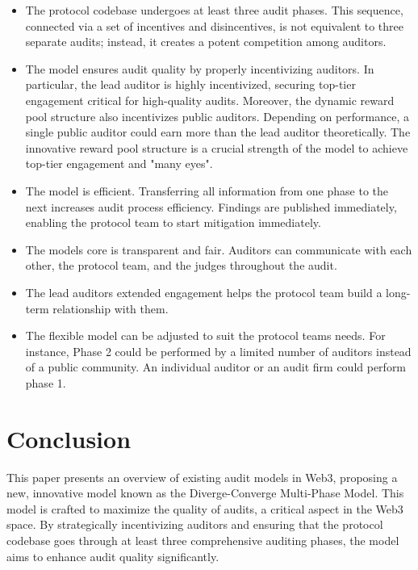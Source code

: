 \documentclass[10pt]{extarticle}
\def\tightlist{}
\begin{document}
\begin{itemize}
\tightlist
\item
  The protocol codebase undergoes at least three audit phases. This
  sequence, connected via a set of incentives and disincentives, is not
  equivalent to three separate audits; instead, it creates a potent
  competition among auditors.
\item
  The model ensures audit quality by properly incentivizing auditors. In
  particular, the lead auditor is highly incentivized, securing top-tier
  engagement critical for high-quality audits. Moreover, the dynamic
  reward pool structure also incentivizes public auditors. Depending on
  performance, a single public auditor could earn more than the lead
  auditor theoretically. The innovative reward pool structure is a
  crucial strength of the model to achieve top-tier engagement and "many
  eyes".
\item
  The model is efficient. Transferring all information from one phase to
  the next increases audit process efficiency. Findings are published
  immediately, enabling the protocol team to start mitigation
  immediately.
\item
  The model\textquotesingle s core is transparent and fair. Auditors can
  communicate with each other, the protocol team, and the judges
  throughout the audit.
\item
  The lead auditor\textquotesingle s extended engagement helps the
  protocol team build a long-term relationship with them.
\item
  The flexible model can be adjusted to suit the protocol
  team\textquotesingle s needs. For instance, Phase 2 could be performed
  by a limited number of auditors instead of a public community. An
  individual auditor or an audit firm could perform phase 1.
\end{itemize}

\section{ Conclusion}\label{5-conclusion}

This paper presents an overview of existing audit models in Web3,
proposing a new, innovative model known as the Diverge-Converge
Multi-Phase Model. This model is crafted to maximize the quality of
audits, a critical aspect in the Web3 space. By strategically
incentivizing auditors and ensuring that the protocol codebase goes
through at least three comprehensive auditing phases, the model aims to
enhance audit quality significantly.
\end{document}
